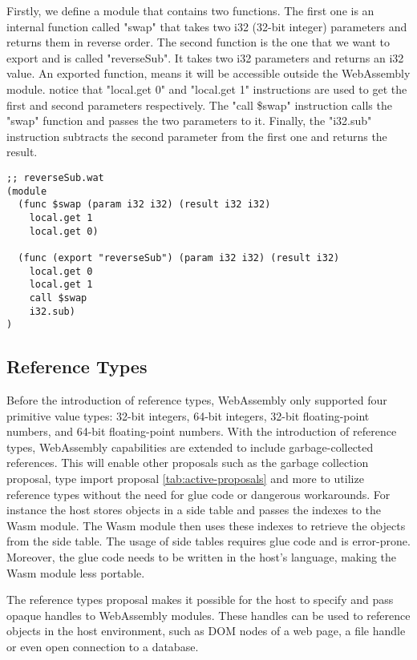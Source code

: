 Firstly, we define a module that contains two functions. The first one is an internal function called "swap" that takes two i32 (32-bit integer) parameters and returns them in reverse order. The second function is the one that we want to export and is called "reverseSub". It takes two i32 parameters and returns an i32 value. An exported function, means it will be accessible outside the WebAssembly module. notice that "local.get 0" and "local.get 1" instructions are used to get the first and second parameters respectively. The "call \$swap" instruction calls the "swap" function and passes the two parameters to it. Finally, the "i32.sub" instruction subtracts the second parameter from the first one and returns the result.

\begin{lstlisting}[frame=lines, style=Wasm, caption={A reverse subtraction function that demonstrates the proposal for returning multiple values}, showstringspaces=false, captionpos=b, label=code:multi-values]
;; reverseSub.wat
(module
  (func $swap (param i32 i32) (result i32 i32)
    local.get 1
    local.get 0)

  (func (export "reverseSub") (param i32 i32) (result i32)
    local.get 0
    local.get 1
    call $swap
    i32.sub)
)
\end{lstlisting}

\subsection{Reference Types}
\label{subsec:reference-types}

Before the introduction of reference types, WebAssembly only supported four primitive value types: 32-bit integers, 64-bit integers, 32-bit floating-point numbers, and 64-bit floating-point numbers. With the introduction of reference types, WebAssembly capabilities are extended to include garbage-collected references. This will enable other proposals such as the garbage collection proposal, type import proposal \ref{tab:active-proposals} and more to utilize reference types without the need for glue code or dangerous workarounds. For instance the host stores objects in a side table and passes the indexes to the Wasm module. The Wasm module then uses these indexes to retrieve the objects from the side table. The usage of side tables requires glue code and is error-prone. Moreover, the glue code needs to be written in the host's language, making the Wasm module less portable.

The reference types proposal makes it possible for the host to specify and pass opaque handles to WebAssembly modules. These handles can be used to reference objects in the host environment, such as DOM nodes of a web page, a file handle or even open connection to a database. 

